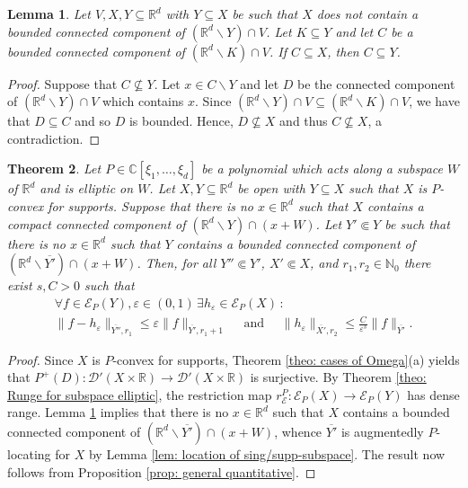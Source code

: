 \documentclass[12pt]{amsart}
\newcommand{\N}{\mathbb{N}}
\newcommand{\R}{\mathbb{R}}
\newcommand{\C}{\mathbb{C}}
\newtheorem{theorem}{Theorem}[section]
\newtheorem{lemma}[theorem]{Lemma}
\theoremstyle{definition}
\theoremstyle{remark}
\numberwithin{equation}{section}
\begin{document}
\begin{lemma}\label{prop: geometric}
	Let $V,X,Y \subseteq\R^d$  with $Y \subseteq X$ be  such that  $X$ does not contain a bounded connected component of $\left(\R^d\backslash Y\right)\cap V$. Let $K \subseteq Y$ and let $C$ be a bounded connected component of $\left(\R^d\backslash K\right)\cap V$. If $C \subseteq X$, then $C \subseteq Y$.
\end{lemma}

\begin{proof}
Suppose that $C \not \subseteq Y$. Let $x\in C \backslash Y$ and let $D$ be the connected component of $\left(\R^d\backslash Y\right)\cap V$ which contains $x$. Since $\left(\R^d\backslash Y\right)\cap V \subseteq \left(\R^d\backslash K\right)\cap V$, we have that $D \subseteq C$ and so $D$ is bounded. Hence, $D \not \subseteq X$ and thus $C \not \subseteq X$, a contradiction.
\end{proof}


\begin{theorem}\label{theo: quantitative Runge for subspace elliptic}
	Let $P\in\C[\xi_1,\ldots,\xi_d]$ be a polynomial which acts along a subspace $W$ of $\R^d$ and is elliptic on $W$. Let $X,Y \subseteq\R^d$ be open with $Y \subseteq X$ such that $X$ is $P$-convex for supports. Suppose that there is no $x\in\R^d$ such that $X$ contains a compact connected component of $(\R^d\backslash Y)\cap (x+W)$. Let $Y'\Subset Y$ be  such that there is no $x\in\R^d$ such that $Y$ contains a bounded connected component of  $(\R^d\backslash\overline{Y'})\cap (x+W)$. Then, for all $Y'' \Subset Y'$, $X' \Subset X$, and  $r_1,r_2\in\N_0$  there exist $s, C>0$ such that
	\begin{gather*}
		\forall f\in\mathscr{E}_P(Y), \varepsilon\in (0,1) \,\exists h_\varepsilon \in\mathscr{E}_P(X) \, :\\
		\|f-h_\varepsilon\|_{\overline{Y''},r_1}\leq \varepsilon\|f\|_{\overline{Y'},r_1+1} \quad \mbox{ and } \quad \|h_\varepsilon\|_{\overline{X'},r_2}\leq\frac{C}{\varepsilon^s}\|f\|_{\overline{Y'}}.
	\end{gather*}
\end{theorem}

\begin{proof}
	Since $X$ is $P$-convex for supports,  Theorem \ref{theo: cases of Omega}(a) yields that $P^+(D): \mathscr{D}'(X\times\R) \to \mathscr{D}'(X\times\R)$ is surjective. By Theorem \ref{theo: Runge for subspace elliptic}, the restriction map $r_\mathscr{E}^P:\mathscr{E}_P(X)\rightarrow\mathscr{E}_P(Y)$ has dense range.  Lemma \ref{prop: geometric} implies  that there is no $x\in\R^d$ such that $X$ contains a bounded connected component of $\left(\R^d\backslash\overline{Y'}\right)\cap\left(x+W\right)$, whence $\overline{Y'}$ is augmentedly $P$-locating for $X$ by Lemma \ref{lem: location of sing/supp-subspace}.  The result now  follows from Proposition \ref{prop: general quantitative}.
\end{proof}
 
\end{document}
